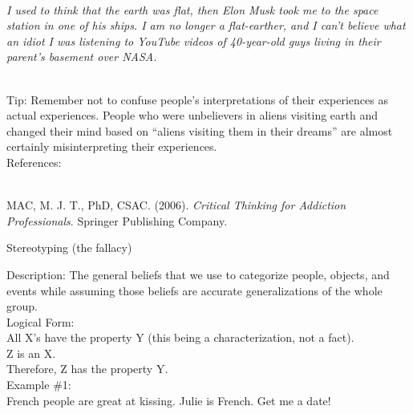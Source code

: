 \documentclass[a4paper,12pt,single,pdftex]{scrartcl}
\begin{document}
    \\

    
      {\em I used to think that the earth was flat, then Elon Musk took me to the space station in one of his ships. I am no longer a flat-earther, and I can’t believe what an idiot I was listening to YouTube videos of 40-year-old guys living in their parent’s basement over NASA.} \newline

    \\

    
      Tip: Remember not to confuse people’s interpretations of their experiences as actual experiences. People who were unbelievers in aliens visiting earth and changed their mind based on “aliens visiting them in their dreams” are almost certainly misinterpreting their experiences.
    \\

    References:

    
      
        
      \\

      
        
          MAC, M. J. T., PhD, CSAC. (2006). {\it Critical Thinking for Addiction Professionals}. Springer Publishing Company.
        
      
    
  

Stereotyping (the fallacy)
    
      
        Description: The general beliefs that we use to categorize people, objects, and events while assuming those beliefs are accurate generalizations of the whole group.
      \\

      
        Logical Form:
      \\

      
        All X’s have the property Y (this being a characterization, not a fact).
      \\

      
        Z  is an X.
      \\

      
        Therefore, Z has the property Y.
      \\

      
        Example \#1:
      \\

      
        French people are great at kissing.  Julie is French.  Get me a date!
      \\
\end{document}
